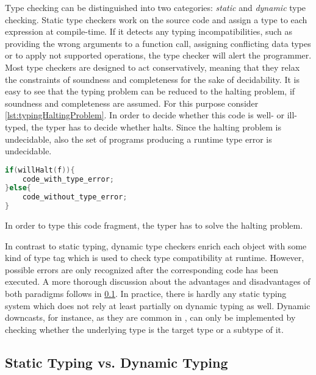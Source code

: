 Type checking can be distinguished into two categories: \emph{static} and \emph{dynamic} type checking.
Static type checkers work on the source code and assign a type to each expression at compile-time.
If it detects any typing incompatibilities, such as providing the wrong arguments to a function call, assigning conflicting data types or to apply not supported operations, the type checker will alert the programmer.
Most type checkers are designed to act conservatively, meaning that they relax the constraints of soundness and completeness for the sake of decidability.
It is easy to see that the typing problem can be reduced to the halting problem, if soundness and completeness are assumed.
For this purpose consider \cref{lst:typingHaltingProblem}.
In order to decide whether this code is well- or ill-typed, the typer has to decide whether  halts.
Since the halting problem is undecidable, also the set of programs producing a runtime type error is undecidable.
\begin{listing}[!h]
	\begin{CenteredBox}
		\begin{lstlisting}[language=C++,
		commentstyle=\color{black},
		stringstyle=\color{black},
		keywordstyle=\color{black}\bfseries,
		]
if(willHalt(f)){
	code_with_type_error;
}else{
	code_without_type_error;
}
		\end{lstlisting}
	\end{CenteredBox}
	\caption{In order to type this code fragment, the typer has to solve the halting problem.}
	\label{lst:typingHaltingProblem}
\end{listing}

In contrast to static typing, dynamic type checkers enrich each object with some kind of type tag which is used to check type compatibility at runtime.
However, possible errors are only recognized after the corresponding code has been executed.
A more thorough discussion about the advantages and disadvantages of both paradigms follows in \cref{sec:staticVSDynamic}.
In practice, there is hardly any static typing system which does not rely at least partially on dynamic typing as well.
Dynamic downcasts, for instance, as they are common in , can only be implemented by checking whether the underlying type is the target type or a subtype of it.

\subsection{Static Typing vs. Dynamic Typing}
\label{sec:staticVSDynamic}

